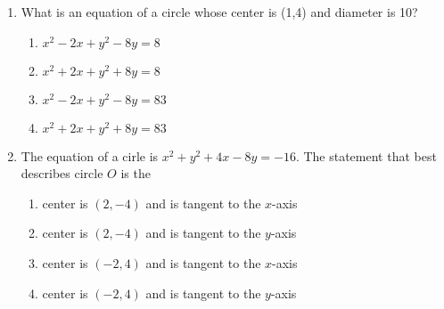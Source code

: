 \documentclass[12pt, twoside]{article}
\begin{document}
\begin{enumerate}
\item %
What is an equation of a circle whose center is (1,4) and diameter is 10?
  \begin{enumerate}
    \item $x^2-2x+y^2-8y=8$
    \item $x^2+2x+y^2+8y=8$
    \item $x^2-2x+y^2-8y=83$
    \item $x^2+2x+y^2+8y=83$
  \end{enumerate}    
     
  \item %
  The equation of a cirle is $x^2+y^2+4x-8y=-16$. The statement that best describes circle $O$ is the
    \begin{enumerate}
      \item center is $(2,-4)$ and is tangent to the $x$-axis
      \item center is $(2,-4)$ and is tangent to the $y$-axis
      \item center is $(-2,4)$ and is tangent to the $x$-axis
      \item center is $(-2,4)$ and is tangent to the $y$-axis
    \end{enumerate}


  \end{enumerate}
\end{document}

